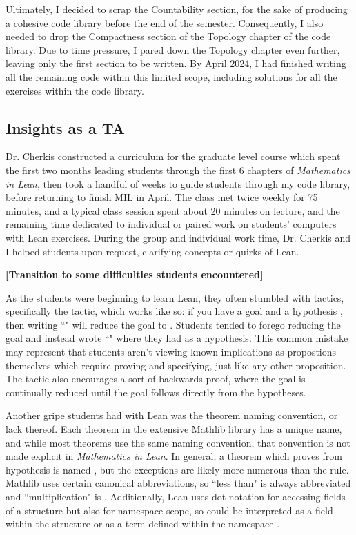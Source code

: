 Ultimately,
I decided to scrap the Countability section, for the sake of producing a 
cohesive code library before the end of the semester. Consequently, I also
needed to drop the Compactness section of the Topology chapter of
the code library. Due to time pressure, I pared down the Topology chapter
even further, leaving only the first section to be written. By April 2024, 
I had finished writing all the remaining code within this limited scope, 
including solutions for all the exercises within the code library.

\subsection{Insights as a TA}

Dr. Cherkis constructed a curriculum for the graduate level course 
which spent the first two months leading students through the first 6
chapters of \textit{Mathematics in Lean}, then took a handful of weeks to 
guide students through my code library, before returning to finish 
MIL in April. The class met twice weekly for 75 minutes, and a typical class
session spent about 20 minutes on lecture, and the remaining time dedicated
to individual or paired work on students' computers with Lean exercises. During
the group and individual work time, Dr. Cherkis and I helped students upon 
request, clarifying concepts or quirks of Lean.

\textbf{[Transition to some difficulties students encountered]}

As the students were beginning to learn Lean, they often stumbled with
tactics, specifically the  tactic, which works like so:
if you have a goal  and a hypothesis , 
then writing ``" will reduce the goal to . 
Students tended to forego reducing the goal and instead wrote 
``" where they had  as a hypothesis. This common
mistake may represent that students aren't viewing known implications as
propostions themselves which require proving and specifying, just like
any other proposition. The  tactic also encourages a sort of
backwards proof, where the goal is continually reduced until the goal 
follows directly from the hypotheses. 

Another gripe students had with Lean was the theorem naming convention, or lack
thereof. Each theorem in the extensive Mathlib library has a unique
name, and while most theorems use the same naming convention, that
convention is not made explicit in \textit{Mathematics in Lean}. In general, 
a theorem which proves  from hypothesis  is named
, but the exceptions are likely more numerous than
the rule. Mathlib uses certain canonical abbreviations, so ``less than" is
always abbreviated  and ``multiplication" is . Additionally,
Lean uses dot notation for accessing fields of a structure but also
for namespace scope, so  could be 
interpreted as a field within the structure  or as
a term defined within the namespace . 

